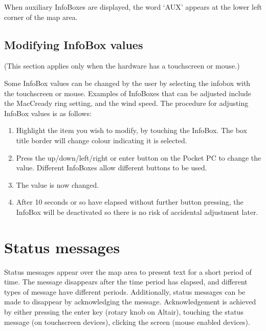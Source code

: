 \documentclass[a4paper,12pt]{refrep}
\newcommand{\InfoBox}[0]{{InfoBox}}
\begin{document}
When auxiliary {\InfoBox}es are displayed, the word `AUX' appears at the
lower left corner of the map area.

%
\subsection*{Modifying {\InfoBox} values}

(This section applies only when the hardware has
a touchscreen or mouse.)

Some {\InfoBox} values can be changed by the user by selecting the
infobox with the touchscreen or mouse.  Examples of InfoBoxes that can
be adjusted include the MacCready ring setting, and the wind speed.
The procedure for adjusting {\InfoBox} values is as follows:
\begin{enumerate}
\item Highlight the item you wish to modify, by touching the {\InfoBox}.
  The box title border will change colour indicating it is selected.
\item Press the up/down/left/right or enter button on the Pocket PC
  to change the value.  Different {\InfoBox}es allow different buttons to
  be used.
\item The value is now changed.
\item After 10 seconds or so have elapsed without further button pressing,
  the {\InfoBox} will be deactivated so there is no risk of accidental 
  adjustment later.
\end{enumerate}
%

\section{Status messages}
Status messages appear over the map area to present text for a short
period of time.  The message disappears after the time period has
elapsed, and different types of message have different periods.
Additionally, status messages can be made to disappear by
acknowledging the message.  Acknowledgement is achieved by either
pressing the enter key (rotary knob on Altair), touching the status
message (on touchscreen devices), clicking the screen (mouse enabled
devices).
\end{document}
